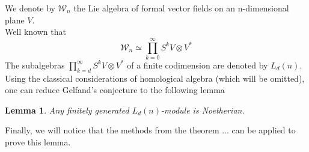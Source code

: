 \documentclass[12pt,a4paper]{article}
\newtheorem{lemma}{Lemma}[subsection]
\begin{document}
    We denote by $\mathcal{W}_n$ the Lie algebra of formal vector fields on an n-dimensional plane $V$.\\
    Well known that
    \[\mathcal{W}_n\simeq \prod\limits_{k=0}^{\infty}S^k V\otimes V^*\]
    The subalgebras $\prod\limits_{k=d}^{\infty}S^k V\otimes V^*$ of a finite codimension are denoted by $L_d(n)$.
    Using the classical considerations of homological algebra (which will be omitted), one can reduce Gelfand's conjecture to the following lemma
    \vskip 0.1in\noindent
    \begin{lemma}
        Any finitely generated $L_d(n)$-module is Noetherian.
    \end{lemma}
    \vskip 0.1in\noindent

    Finally, we will notice that the methods from the theorem ... can be applied to prove this lemma.
\end{document}
